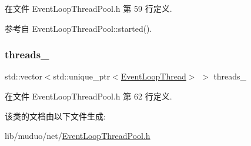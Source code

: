 在文件 Event\+Loop\+Thread\+Pool.\+h 第 59 行定义.



参考自 Event\+Loop\+Thread\+Pool\+::started().

\mbox{\label{classmuduo_1_1net_1_1EventLoopThreadPool_ac9f6b1fc15d40cc0a17bcb5422cd6c4d}} 
\subsubsection{\texorpdfstring{threads\+\_\+}{threads\_}}
{\footnotesize\ttfamily std\+::vector$<$std\+::unique\+\_\+ptr$<$\hyperlink{classmuduo_1_1net_1_1EventLoopThread}{Event\+Loop\+Thread}$>$ $>$ threads\+\_\+\hspace{0.3cm}{\ttfamily [private]}}



在文件 Event\+Loop\+Thread\+Pool.\+h 第 62 行定义.



该类的文档由以下文件生成\+:\begin{DoxyCompactItemize}
\item 
lib/muduo/net/\hyperlink{muduo_2net_2EventLoopThreadPool_8h}{Event\+Loop\+Thread\+Pool.\+h}\end{DoxyCompactItemize}
